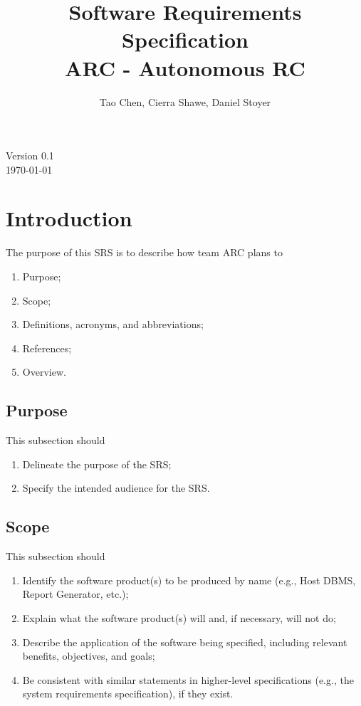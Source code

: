 \documentclass[draftclsnofoot,onecolumn,10pt]{IEEEtran}
\date{}
\begin{document}
\begin{titlepage}
	\title{Software Requirements Specification\\
	ARC - Autonomous RC}
	\author{Tao Chen, Cierra Shawe, Daniel Stoyer}
	\maketitle
	\begin{center}
	Version 0.1\\
	\vspace{1.9cm}
	\today
	\end{center}

	\thispagestyle{empty} %
	
\end{titlepage}

\tableofcontents
\newpage

\section{Introduction}

The purpose of this SRS is to describe how team ARC plans to 
\begin{enumerate}
	\item Purpose;
	\item Scope;
	\item Definitions, acronyms, and abbreviations;
	\item References;
	\item Overview.
\end{enumerate}


\subsection{Purpose}
This subsection should
\begin{enumerate}
	\item Delineate the purpose of the SRS;
	\item Specify the intended audience for the SRS.
\end{enumerate}

\subsection{Scope}
This subsection should
\begin{enumerate}
	\item Identify the software product(s) to be produced by name (e.g., Host
		DBMS, Report Generator, etc.);
	\item Explain what the software product(s) will and, if necessary, will not
		do;
	\item Describe the application of the software being specified, including
		relevant benefits, objectives, and goals;
	\item Be consistent with similar statements in higher-level specifications
		(e.g., the system requirements specification), if they exist.
\end{enumerate}
\end{document}
